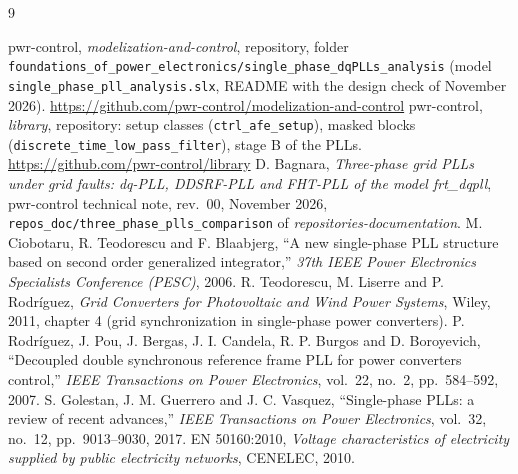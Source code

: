\documentclass[11pt,a4paper]{scrartcl}
\newcommand{\code}[1]{\texttt{#1}}
\newcommand{\us}{\_\allowbreak}  %
\begin{document}
\begin{onehalfspace}
\begin{thebibliography}{9}
	\raggedright
	 pwr-control, \emph{modelization-and-control}, repository, folder \code{foundations\us of\us power\us electronics/\allowbreak single\us phase\us dqPLLs\us analysis} (model \code{single\_phase\_pll\_analysis.slx}, README with the design check of November 2026). \url{https://github.com/pwr-control/modelization-and-control}
	 pwr-control, \emph{library}, repository: setup classes (\code{ctrl\_afe\_setup}), masked blocks (\code{discrete\_time\_low\_pass\_filter}), stage B of the PLLs. \url{https://github.com/pwr-control/library}
	 D. Bagnara, \emph{Three-phase grid PLLs under grid faults: dq-PLL, DDSRF-PLL and FHT-PLL of the model frt\_dqpll}, pwr-control technical note, rev.~00, November 2026, \code{repos\_doc/three\_phase\_plls\_comparison} of \emph{repositories-documentation}.
	 M. Ciobotaru, R. Teodorescu and F. Blaabjerg, ``A new single-phase PLL structure based on second order generalized integrator,'' \emph{37th IEEE Power Electronics Specialists Conference (PESC)}, 2006.
	 R. Teodorescu, M. Liserre and P. Rodr\'iguez, \emph{Grid Converters for Photovoltaic and Wind Power Systems}, Wiley, 2011, chapter 4 (grid synchronization in single-phase power converters).
	 P. Rodr\'iguez, J. Pou, J. Bergas, J. I. Candela, R. P. Burgos and D. Boroyevich, ``Decoupled double synchronous reference frame PLL for power converters control,'' \emph{IEEE Transactions on Power Electronics}, vol.~22, no.~2, pp.~584--592, 2007.
	 S. Golestan, J. M. Guerrero and J. C. Vasquez, ``Single-phase PLLs: a review of recent advances,'' \emph{IEEE Transactions on Power Electronics}, vol.~32, no.~12, pp.~9013--9030, 2017.
	 EN 50160:2010, \emph{Voltage characteristics of electricity supplied by public electricity networks}, CENELEC, 2010.
\end{thebibliography}

\end{onehalfspace}
\end{document}
